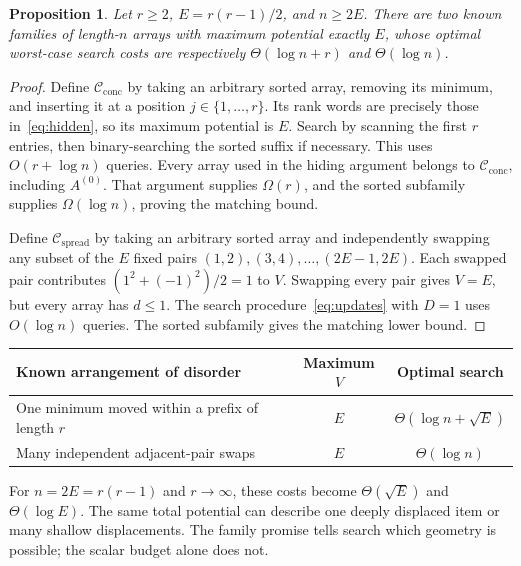 \documentclass[10pt,letterpaper]{article}
\newtheorem{proposition}[theorem]{Proposition}
\newcommand{\Cconc}{\mathcal C_{\mathrm{conc}}}
\newcommand{\Cspread}{\mathcal C_{\mathrm{spread}}}
\begin{document}
\begin{proposition}\label{prop:location}
Let $r\geq2$, $E=r(r-1)/2$, and $n\geq2E$. There are two known families of
length-$n$ arrays with maximum potential exactly $E$, whose optimal worst-case
search costs are respectively $\Theta(\log n+r)$ and $\Theta(\log n)$.
\end{proposition}
\begin{proof}
Define $\Cconc$ by taking an arbitrary sorted array, removing its minimum, and inserting
it at a position $j\in\{1,\ldots,r\}$. Its rank words are precisely those
in~\eqref{eq:hidden}, so its maximum potential is $E$. Search by scanning the first $r$
entries, then binary-searching the sorted suffix if necessary. This uses
$O(r+\log n)$ queries. Every array used in the hiding argument belongs to $\Cconc$,
including $A^{(0)}$. That argument supplies $\Omega(r)$, and the sorted subfamily
supplies $\Omega(\log n)$, proving the matching bound.

Define $\Cspread$ by taking an arbitrary sorted array and independently swapping any
subset of the $E$ fixed pairs $(1,2),(3,4),\ldots,(2E-1,2E)$. Each swapped pair
contributes $(1^2+(-1)^2)/2=1$ to $V$. Swapping every pair gives $V=E$, but every
array has $d\leq1$. The search procedure~\eqref{eq:updates} with $D=1$ uses
$O(\log n)$ queries. The sorted subfamily gives the matching lower bound.
\end{proof}

\begin{center}
\renewcommand{\arraystretch}{1.18}
\begin{tabular}{@{}p{3.6in}cc@{}}
\toprule
\textbf{Known arrangement of disorder}&\textbf{Maximum $V$}&\textbf{Optimal search}\\
\midrule
One minimum moved within a prefix of length $r$&$E$&$\Theta(\log n+\sqrt E)$\\
Many independent adjacent-pair swaps&$E$&$\Theta(\log n)$\\
\bottomrule
\end{tabular}
\end{center}
For $n=2E=r(r-1)$ and $r\to\infty$, these costs become $\Theta(\sqrt E)$ and
$\Theta(\log E)$. The same total potential can describe one deeply displaced item or
many shallow displacements. The family promise tells search which geometry is possible;
the scalar budget alone does not.
\end{document}
